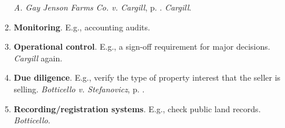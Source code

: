 \begin{enumerate}
\begin{enumerate}
        \emph{A. Gay Jenson Farms Co. v. Cargill}, p.  
        \pageref{subsub:cargill}. \emph{Cargill}.
        \item \textbf{Monitoring}. E.g., accounting audits.
        \item \textbf{Operational control}. E.g., a sign-off requirement for 
        major decisions. \emph{Cargill} again.
        \item \textbf{Due diligence}. E.g., verify the type of property 
        interest that the seller is selling. \emph{Botticello v. Stefanovicz}, 
        p. \pageref{par:botticello}.
        \item \textbf{Recording/registration systems}. E.g., check public land 
        records. \emph{Botticello}.
    \end{enumerate}
\end{enumerate}

